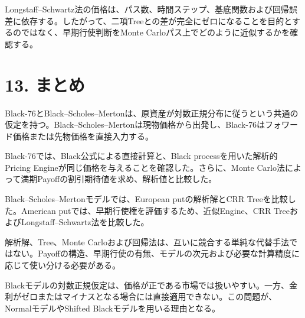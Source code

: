 \documentclass[
  letterpaper,
  DIV=11,
  numbers=noendperiod]{scrreprt}
\begin{document}
Longstaff--Schwartz法の価格は、パス数、時間ステップ、基底関数および回帰誤差に依存する。したがって、二項Treeとの差が完全にゼロになることを目的とするのではなく、早期行使判断をMonte
Carloパス上でどのように近似するかを確認する。

\section{13. まとめ}\label{ux307eux3068ux3081-2}

Black-76とBlack--Scholes--Mertonは、原資産が対数正規分布に従うという共通の仮定を持つ。Black--Scholes--Mertonは現物価格から出発し、Black-76はフォワード価格または先物価格を直接入力する。

Black-76では、Black公式による直接計算と、Black
processを用いた解析的Pricing
Engineが同じ価格を与えることを確認した。さらに、Monte
Carlo法によって満期Payoffの割引期待値を求め、解析値と比較した。

Black--Scholes--Mertonモデルでは、European putの解析解とCRR
Treeを比較した。American
putでは、早期行使権を評価するため、近似Engine、CRR
TreeおよびLongstaff--Schwartz法を比較した。

解析解、Tree、Monte
Carloおよび回帰法は、互いに競合する単純な代替手法ではない。Payoffの構造、早期行使の有無、モデルの次元および必要な計算精度に応じて使い分ける必要がある。

Blackモデルの対数正規仮定は、価格が正である市場では扱いやすい。一方、金利がゼロまたはマイナスとなる場合には直接適用できない。この問題が、NormalモデルやShifted
Blackモデルを用いる理由となる。
\end{document}
